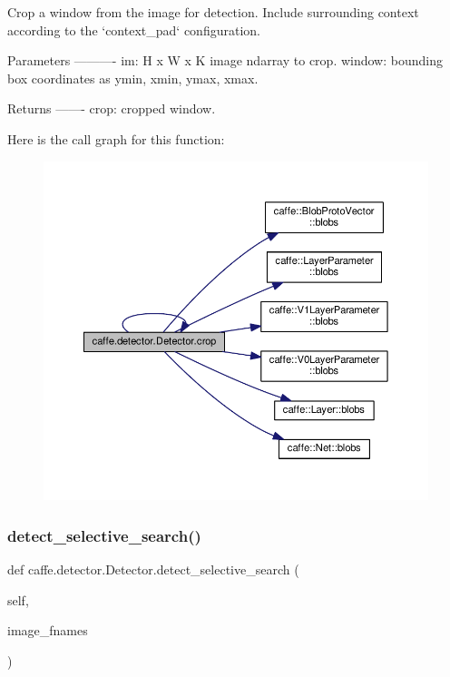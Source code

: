 \begin{DoxyVerb}Crop a window from the image for detection. Include surrounding context
according to the `context_pad` configuration.

Parameters
----------
im: H x W x K image ndarray to crop.
window: bounding box coordinates as ymin, xmin, ymax, xmax.

Returns
-------
crop: cropped window.
\end{DoxyVerb}
 Here is the call graph for this function\+:
\nopagebreak
\begin{figure}[H]
\begin{center}
\leavevmode
\includegraphics[width=350pt]{classcaffe_1_1detector_1_1_detector_af71bb7e173a228c2e1577b9125310216_cgraph}
\end{center}
\end{figure}
\mbox{\label{classcaffe_1_1detector_1_1_detector_a2d96c53701abd37152c5f078a18ebf08}} 
\subsubsection{\texorpdfstring{detect\+\_\+selective\+\_\+search()}{detect\_selective\_search()}\hspace{0.1cm}{\footnotesize\ttfamily [1/2]}}
{\footnotesize\ttfamily def caffe.\+detector.\+Detector.\+detect\+\_\+selective\+\_\+search (\begin{DoxyParamCaption}\item[{}]{self,  }\item[{}]{image\+\_\+fnames }\end{DoxyParamCaption})}

